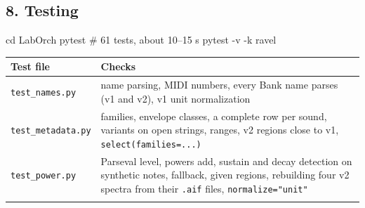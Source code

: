 \documentclass[
  10pt,
]{article}
\newenvironment{Shaded}{\begin{snugshade}}{\end{snugshade}}
\newcommand{\BuiltInTok}[1]{#1}
\newcommand{\ExtensionTok}[1]{#1}
\newcommand{\NormalTok}[1]{#1}
\begin{document}
\subsection{8. Testing}

\begin{Shaded}
\begin{Highlighting}[]
\BuiltInTok{cd}\NormalTok{ LabOrch}
\ExtensionTok{pytest}\NormalTok{            \# 61 tests, about 10–15 s}
\ExtensionTok{pytest}\NormalTok{ {-}v {-}k ravel}
\end{Highlighting}
\end{Shaded}

\begin{longtable}[]{@{}ll@{}}
\toprule
\begin{minipage}[b]{0.47\columnwidth}\raggedright
Test file\strut
\end{minipage} &
\begin{minipage}[b]{0.47\columnwidth}\raggedright
Checks\strut
\end{minipage}\tabularnewline
\midrule
\endhead
\begin{minipage}[t]{0.47\columnwidth}\raggedright
\texttt{test\_names.py}\strut
\end{minipage} &
\begin{minipage}[t]{0.47\columnwidth}\raggedright
name parsing, MIDI numbers, every Bank name parses (v1 and
v2), v1 unit normalization\strut
\end{minipage}\tabularnewline
\begin{minipage}[t]{0.47\columnwidth}\raggedright
\texttt{test\_metadata.py}\strut
\end{minipage} &
\begin{minipage}[t]{0.47\columnwidth}\raggedright
families, envelope classes, a complete row per sound,
variants on open strings, ranges, v2 regions close to v1,
\texttt{select(families=...)}\strut
\end{minipage}\tabularnewline
\begin{minipage}[t]{0.47\columnwidth}\raggedright
\texttt{test\_power.py}\strut
\end{minipage} &
\begin{minipage}[t]{0.47\columnwidth}\raggedright
Parseval level, powers add, sustain and decay detection on
synthetic notes, fallback, given regions, rebuilding four v2
spectra from their \texttt{.aif} files,
\texttt{normalize="unit"}\strut
\end{minipage}\tabularnewline
\begin{minipage}[t]{0.47\columnwidth}\raggedright

\end{minipage}
\end{longtable}
\end{document}
